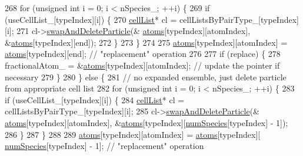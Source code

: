 \begin{DoxyCode}
268                     \textcolor{keywordflow}{for} (\textcolor{keywordtype}{unsigned} \textcolor{keywordtype}{int} i = 0; i < nSpecies\_; ++i) \{
269                         \textcolor{keywordflow}{if} (useCellList\_[typeIndex][i]) \{
270                             \hyperlink{classcell_list}{cellList}* cl = cellListsByPairType\_[typeIndex][i];
271                             cl->\hyperlink{classcell_list_a31caca1e8dd05c33215ac7495d55aeea}{swapAndDeleteParticle}(&
      \hyperlink{classsim_system_a90421b19082f7fb8fc23b7264b1161e4}{atoms}[typeIndex][atomIndex], &\hyperlink{classsim_system_a90421b19082f7fb8fc23b7264b1161e4}{atoms}[typeIndex][end]);
272                         \}
273                     \}
274 
275                     \hyperlink{classsim_system_a90421b19082f7fb8fc23b7264b1161e4}{atoms}[typeIndex][atomIndex] = \hyperlink{classsim_system_a90421b19082f7fb8fc23b7264b1161e4}{atoms}[typeIndex][end];    \textcolor{comment}{// "replacement"
       operation}
276 
277                     \textcolor{keywordflow}{if} (replace) \{
278                         fractionalAtom\_ = &\hyperlink{classsim_system_a90421b19082f7fb8fc23b7264b1161e4}{atoms}[typeIndex][atomIndex];    \textcolor{comment}{// update the pointer if
       necessary}
279                     \}
280                 \} \textcolor{keywordflow}{else} \{
281                     \textcolor{comment}{// no expanded ensemble, just delete particle from appropriate cell list}
282                     \textcolor{keywordflow}{for} (\textcolor{keywordtype}{unsigned} \textcolor{keywordtype}{int} i = 0; i < nSpecies\_; ++i) \{
283                         \textcolor{keywordflow}{if} (useCellList\_[typeIndex][i]) \{
284                             \hyperlink{classcell_list}{cellList}* cl = cellListsByPairType\_[typeIndex][i];
285                             cl->\hyperlink{classcell_list_a31caca1e8dd05c33215ac7495d55aeea}{swapAndDeleteParticle}(&
      \hyperlink{classsim_system_a90421b19082f7fb8fc23b7264b1161e4}{atoms}[typeIndex][atomIndex], &\hyperlink{classsim_system_a90421b19082f7fb8fc23b7264b1161e4}{atoms}[typeIndex][\hyperlink{classsim_system_a9eea865e6dc1cff377b1e79c4d9c23f0}{numSpecies}[typeIndex] - 1]);
286                         \}
287                     \}
288 
289                     \hyperlink{classsim_system_a90421b19082f7fb8fc23b7264b1161e4}{atoms}[typeIndex][atomIndex] = \hyperlink{classsim_system_a90421b19082f7fb8fc23b7264b1161e4}{atoms}[typeIndex][
      \hyperlink{classsim_system_a9eea865e6dc1cff377b1e79c4d9c23f0}{numSpecies}[typeIndex] - 1];    \textcolor{comment}{// "replacement" operation}

\end{DoxyCode}
